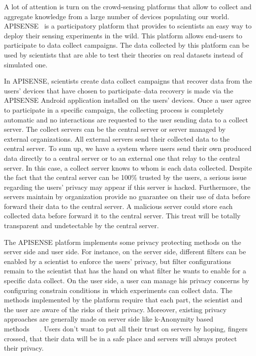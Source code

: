 


A lot of attention is turn on the crowd-sensing platforms that allow to collect and aggregate knowledge from a large number of devices populating our world.
APISENSE~\cite{DBLP:conf/dais/HadererRS13} is a participatory platform that provides to scientists an easy way to deploy their sensing experiments in the wild.
This platform allows end-users to participate to data collect campaigns.
The data collected by this platform can be used by scientists that are able to test their theories on real datasets instead of simulated one.


In APISENSE, scientists create data collect campaigns that recover data from the users' devices that have chosen to participate--data recovery is made via the APISENSE Android application installed on the users' devices.
Once a user agree to participate in a specific campaign, the collecting process is completely automatic and no interactions are requested to the user sending data to a collect server.
The collect servers can be the central server or server managed by external organizations.
All external servers send their collected data to the central server.
To sum up, we have a system where users send their own produced data directly to a central server or to an external one that relay to the central server.
In this case, a collect server knows to whom is each data collected.
Despite the fact that the central server can be 100\% trusted by the users, a serious issue regarding the users' privacy may appear if this server is hacked.
Furthermore, the servers maintain by organization provide no guarantee on their use of data before forward their data to the central server.
A malicious server could store each collected data before forward it to the central server.
This treat will be totally transparent and undetectable by the central server.


The APISENSE platform implements some privacy protecting methods on the server side and user side.
For instance, on the server side, different filters can be enabled by a scientist to enforce the users' privacy, but filter configurations remain to the scientist that has the hand on what filter he wants to enable for a specific data collect.
On the user side, a user can manage his privacy concerns by configuring constrain conditions in which experiments can collect data.
The methods implemented by the platform require that each part, the scientist and the user are aware of the risks of their privacy.
Moreover, existing privacy approaches are generally made on server side like k-Anonymity based methods~\cite{DBLP:journals/ijufks/Sweene02}~\cite{DBLP:conf/icde/LiLV07}~\cite{DBLP:conf/icde/MachanavajjhalaGKV06}.
Users don't want to put all their trust on servers by hoping, fingers crossed, that their data will be in a safe place and servers will always protect their privacy.

